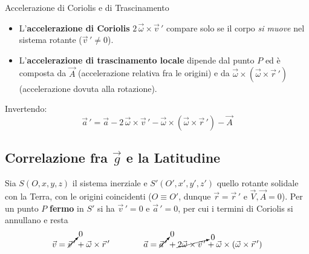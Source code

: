 \begin{definizione}{Accelerazione di Coriolis e di Trascinamento}
\begin{itemize}[leftmargin=1.4em]
    \item L'\textbf{accelerazione di Coriolis} $2\,\vec{\omega}\times\vec{v}\,'$ compare solo se il corpo \emph{si muove} nel sistema rotante ($\vec{v}\,' \neq 0$).
    \item L'\textbf{accelerazione di trascinamento locale} dipende dal punto $P$ ed è composta da $\vec{A}$ (accelerazione relativa fra le origini) e da $\vec{\omega}\times(\vec{\omega}\times\vec{r}\,')$ (accelerazione dovuta alla rotazione).
\end{itemize}
Invertendo:
\begin{equation}
    \vec{a}\,' = \vec{a} - 2\,\vec{\omega}\times\vec{v}\,' - \vec{\omega}\times(\vec{\omega}\times\vec{r}\,') - \vec{A}
\end{equation}
\end{definizione}

\subsection{Correlazione fra $\vec{g}$ e la Latitudine}

Sia $S(O,x,y,z)$ il sistema inerziale e $S'(O',x',y',z')$ quello rotante solidale con la Terra, con le origini coincidenti ($O \equiv O'$, dunque $\vec{r} = \vec{r}\,'$ e $\vec{V}, \vec{A} = 0$). Per un punto $P$ \textbf{fermo} in $S'$ si ha $\vec{v}\,' = 0$ e $\vec{a}\,' = 0$, per cui i termini di Coriolis si annullano e resta
\begin{equation*}
    \vec{v} = \cancelto{0}{\vec{v}\,'} + \vec{\omega}\times\vec{r}\,'
    \qquad\qquad
    \vec{a} = \cancelto{0}{\vec{a}\,'} + \cancelto{0}{2\vec{\omega}\times\vec{v}\,'} + \vec{\omega}\times(\vec{\omega}\times\vec{r}\,')
\end{equation*}

